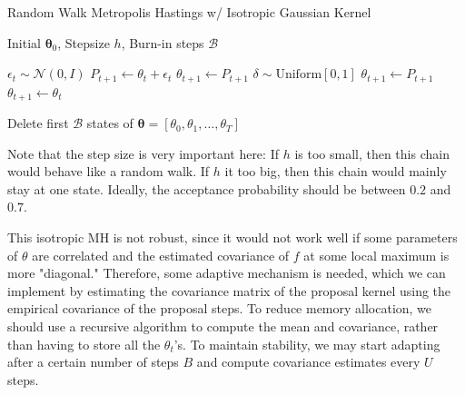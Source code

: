   \begin{algorithm}
    \caption{Random Walk Metropolis Hastings w/ Isotropic Gaussian Kernel}\label{alg:metropolis_gaussian}
    \begin{algorithmic}

    \Require Initial $\boldsymbol{\theta}_0$, Stepsize $h$, Burn-in steps $\mathcal{B}$

        \State $\epsilon_t \sim \mathcal{N}(0, I)$ 
        \State $P_{t+1} \gets \theta_t + \epsilon_t$
            \State $\theta_{t+1} \gets P_{t+1}$ 
        \Else
            \State $\delta \sim \mathrm{Uniform}[0, 1]$
                \State $\theta_{t+1} \gets P_{t+1}$ 
            \Else 
                \State $\theta_{t+1} \gets \theta_t$
            \EndIf
        \EndIf
    \EndFor

    \State Delete first $\mathcal{B}$ states of $\boldsymbol{\theta} = [\theta_0, \theta_1, \ldots, \theta_T]$

    \end{algorithmic}
  \end{algorithm}

  Note that the step size is very important here: If $h$ is too small, then this chain would behave like a random walk. If $h$ it too big, then this chain would mainly stay at one state. Ideally, the acceptance probability should be between $0.2$ and $0.7$. 

  This isotropic MH is not robust, since it would not work well if some parameters of $\theta$ are correlated and the estimated covariance of $f$ at some local maximum is more "diagonal." Therefore, some adaptive mechanism is needed, which we can implement by estimating the covariance matrix of the proposal kernel using the empirical covariance of the proposal steps. To reduce memory allocation, we should use a recursive algorithm to compute the mean and covariance, rather than having to store all the $\theta_t$'s. To maintain stability, we may start adapting after a certain number of steps $B$ and compute covariance estimates every $U$ steps. 

